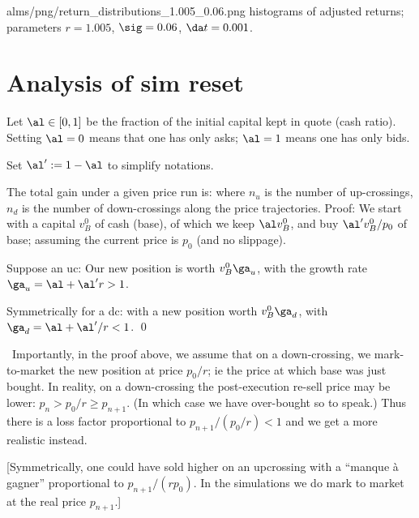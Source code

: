 \documentclass[oneside,twocolumn,12pt]{article}
\begin{document}
\IG{150pt}
{alms/png/return_distributions_1.005_0.06.png}
{\label{1.005-0.06h} histograms of adjusted returns;
parameters $r=1.005$, $\sig=0.06$, $\da t = 0.001$.}

\section{Analysis of sim reset}

Let $\al\in[0,1]$ be the fraction of the initial capital kept in quote (cash ratio).
Setting $\al=0$ means that one has only asks; $\al=1$ means one has only bids.

Set $\al':=1-\al$ to simplify notations.

\PRO 
The total gain under a given price run is:
where $n_u$ is the number of up-crossings, $n_d$
is the number of down-crossings along the price trajectories.
\ORP
Proof:
We start with a capital $v^0_B$ of cash (base),
of which we keep $\al v^0_B$, 
and buy $\al'v^0_B/p_0$ of base; assuming the current price is $p_0$ (and no slippage). 

Suppose an uc:
Our new position is worth $v^0_B\ga_u$,
with the growth rate $\ga_u=\al+ \al'r>1$.

Symmetrically for a dc:
with a new position worth $v^0_B\ga_d$, with $\ga_d=\al+ \al'/r<1$.
\qed

\NB\ Importantly, in the proof above, 
we assume that on a down-crossing,
we mark-to-market the new position at price $p_0/r$;
ie the price at which base was just bought. 
In reality, on a down-crossing the post-execution re-sell price may be lower:
$p_n>p_0/r\geq p_{n+1}$. (In which case we have over-bought so to speak.)
Thus there is a loss factor proportional to $p_{n+1}/(p_0/r)<1$ and we get 
a more realistic 
instead.

[Symmetrically,
one could have sold higher on an upcrossing with a ``manque à gagner'' proportional 
to $p_{n+1}/(rp_0)$. In the simulations we do mark to market at the real price $p_{n+1}$.]
\end{document}
